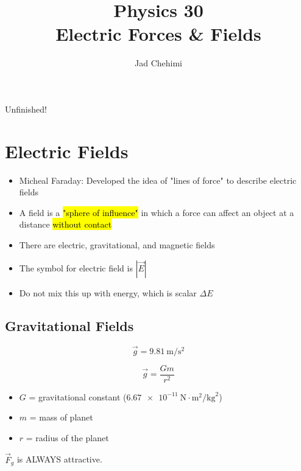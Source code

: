 \documentclass[a4paper,12pt]{article}
\title{Physics 30 \\ Electric Forces \& Fields}
\author{Jad Chehimi}
\begin{document}
\maketitle

\begin{center}
\Huge
Unfinished!
\normalsize
\end{center}

\tableofcontents

\pagebreak

\section{Electric Fields}
\begin{itemize}
    \item{Micheal Faraday: Developed the idea of "lines of force" to describe electric fields}
    \item{A field is a \hl{"sphere of influence"} in which a force can affect an object at a distance \hl{without contact}}
    \item{There are electric, gravitational, and magnetic fields}
    \item{The symbol for electric field is $|\vec{E}|$}
    \item{Do not mix this up with energy, which is scalar $\Delta{E}$}
\end{itemize}

\subsection{Gravitational Fields}
\Large $$\vec{g} = \SI{9.81}{\m\per\s\squared}$$ \normalsize

\Large $$\vec{g} = \frac{Gm}{r^2}$$ \normalsize
\begin{itemize}
    \item{$G$ = gravitational constant ($\SI{6.67e-11}{\N\cdot\m\squared\per\kg\squared}$)}
    \item{$m$ = mass of planet}
    \item{$r$ = radius of the planet}
\end{itemize}

$\vec{F}_g$ is ALWAYS attractive.

\pagebreak
\end{document}
